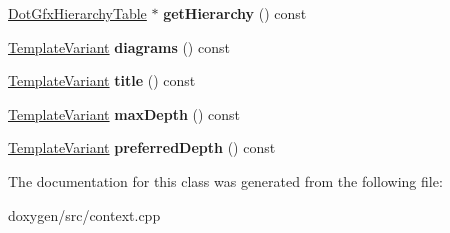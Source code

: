 \begin{DoxyCompactItemize}
\mbox{\label{class_class_hierarchy_context_1_1_private_a8bd608995f342bf6fdbf18cac1653edd}} 
\mbox{\hyperlink{class_dot_gfx_hierarchy_table}{Dot\+Gfx\+Hierarchy\+Table}} $\ast$ {\bfseries get\+Hierarchy} () const
\item 
\mbox{\label{class_class_hierarchy_context_1_1_private_af6d119e69789fcc96c74ead74ed0b672}} 
\mbox{\hyperlink{class_template_variant}{Template\+Variant}} {\bfseries diagrams} () const
\item 
\mbox{\label{class_class_hierarchy_context_1_1_private_aa04f3bf777239e15eed8bb936b59ef03}} 
\mbox{\hyperlink{class_template_variant}{Template\+Variant}} {\bfseries title} () const
\item 
\mbox{\label{class_class_hierarchy_context_1_1_private_aa7868f89d387e9a11e92565d044478b2}} 
\mbox{\hyperlink{class_template_variant}{Template\+Variant}} {\bfseries max\+Depth} () const
\item 
\mbox{\label{class_class_hierarchy_context_1_1_private_a2c2e432b665102fe2c3eb20e66f744a5}} 
\mbox{\hyperlink{class_template_variant}{Template\+Variant}} {\bfseries preferred\+Depth} () const
\end{DoxyCompactItemize}


The documentation for this class was generated from the following file\+:\begin{DoxyCompactItemize}
\item 
doxygen/src/context.\+cpp\end{DoxyCompactItemize}
